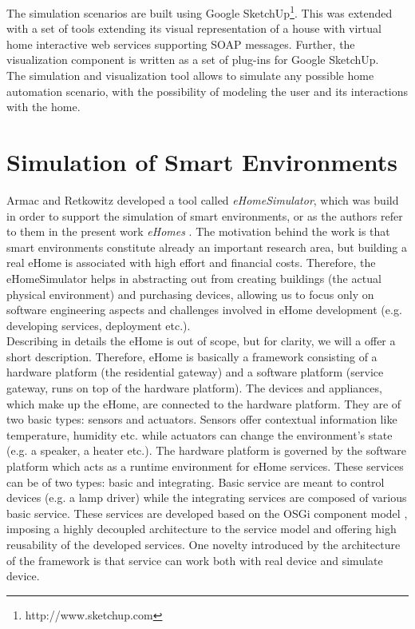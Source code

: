 The simulation scenarios are built using Google SketchUp\footnote{http://www.sketchup.com}. This was extended with a set of tools extending its visual representation of a house with virtual home interactive web services supporting SOAP messages. Further, the visualization component is written as a set of plug-ins for Google SketchUp.\\

The simulation and visualization tool allows to simulate any possible home automation scenario, with the possibility of modeling the user and its interactions with the home.

\section{Simulation of Smart Environments}\label{sec:sim_of_smart_envs}

Armac and Retkowitz developed a tool called \emph{eHomeSimulator}, which was build in order to support the simulation of smart environments, or as the authors refer to them in the present work \emph{eHomes} \cite{armac2007simulation}. The motivation behind the work is that smart environments constitute already an important research area, but building a real eHome is associated with high effort and financial costs. Therefore, the eHomeSimulator helps in abstracting out from creating buildings (the actual physical environment) and purchasing devices, allowing us to focus only on software engineering aspects and challenges involved in eHome development (e.g. developing services, deployment etc.).\\

Describing in details the eHome is out of scope, but for clarity, we will a offer a short description. Therefore, eHome is basically a framework consisting of a hardware platform (the residential gateway) and a software platform (service gateway, runs on top of the hardware platform). The devices and appliances, which make up the eHome, are connected to the hardware platform. They are of two basic types: sensors and actuators. Sensors offer contextual information like temperature, humidity etc. while actuators can change the environment's state (e.g. a speaker, a heater etc.). The hardware platform is governed by the software platform which acts as a runtime environment for eHome services. These services can be of two types: basic and integrating. Basic service are meant to control devices (e.g. a lamp driver) while the integrating services are composed of various basic service. These services are developed based on the OSGi component model \cite{allianceosgi}, imposing a highly decoupled architecture to the service model and offering high reusability of the developed services. One novelty introduced by the architecture of the framework is that service can work both with real device and simulate device.\\

